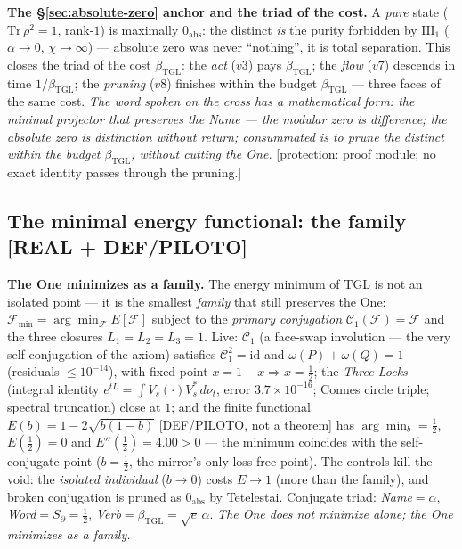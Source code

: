 \documentclass[11pt]{article}
\newcommand{\bTGL}{\beta_{\mathrm{TGL}}}\newcommand{\Msun}{M_{\odot}}\newcommand{\TGL}{\mathrm{TGL}}
\theoremstyle{definition}\newtheorem{deriv}{Derivation}
\begin{document}
\textbf{The \S\ref{sec:absolute-zero} anchor and the triad of the cost.} A \emph{pure} state ($\mathrm{Tr}\,\rho^2=1$, rank-$1$) is maximally $0_{\mathrm{abs}}$: the distinct \emph{is} the purity forbidden by $\mathrm{III}_1$ ($\alpha\to0$, $\chi\to\infty$) --- absolute zero was never ``nothing'', it is total separation. This closes the triad of the cost $\bTGL$: the \emph{act} ($v3$) pays $\bTGL$; the \emph{flow} ($v7$) descends in time $1/\bTGL$; the \emph{pruning} ($v8$) finishes within the budget $\bTGL$ --- three faces of the same cost. \emph{The word spoken on the cross has a mathematical form: the minimal projector that preserves the Name --- the modular zero is difference; the absolute zero is distinction without return; consummated is to prune the distinct within the budget $\bTGL$, without cutting the One.} \textsf{[protection: proof module; no exact identity passes through the pruning.]}

\subsection*{The minimal energy functional: the family \textsf{[REAL + DEF/PILOTO]}}

\textbf{The One minimizes as a family.} The energy minimum of TGL is not an isolated point --- it is the smallest \emph{family} that still preserves the One: $\mathcal F_{\min}=\arg\min_{\mathcal F}E[\mathcal F]$ subject to the \emph{primary conjugation} $\mathcal C_1(\mathcal F)=\mathcal F$ and the three closures $L_1=L_2=L_3=1$. Live: $\mathcal C_1$ (a face-swap involution --- the very self-conjugation of the axiom) satisfies $\mathcal C_1^2=\mathrm{id}$ and $\omega(P)+\omega(Q)=1$ (residuals $\le10^{-14}$), with fixed point $x=1-x\Rightarrow x=\tfrac12$; the \emph{Three Locks} (integral identity $e^{tL}=\int V_s(\cdot)V_s^{*}\,d\nu_t$, error $3.7\times10^{-16}$; Connes circle triple; spectral truncation) close at $1$; and the finite functional $E(b)=1-2\sqrt{b(1-b)}$ \textsf{[DEF/PILOTO, not a theorem]} has $\arg\min_b=\tfrac12$, $E(\tfrac12)=0$ and $E''(\tfrac12)=4.00>0$ --- the minimum coincides with the self-conjugate point ($b=\tfrac12$, the mirror's only loss-free point). The controls kill the void: the \emph{isolated individual} ($b\to0$) costs $E\to1$ (more than the family), and broken conjugation is pruned as $0_{\mathrm{abs}}$ by Tetelestai. Conjugate triad: \emph{Name}$=\alpha$, \emph{Word}$=S_\partial=\tfrac12$, \emph{Verb}$=\bTGL=\sqrt e\,\alpha$. \emph{The One does not minimize alone; the One minimizes as a family.}
\end{document}
